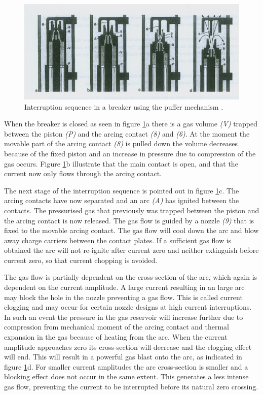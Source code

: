 \documentclass[10pt,a4paper,twoside]{article}
\begin{document}
\begin{figure} [H]
\centering
\includegraphics[scale=0.8]{Bilder/Theory/CircutBreakPuff1.png}
\caption{Interruption sequence in a breaker using the puffer mechanism \cite{bib:HVEbreak}.} \label{fig:CircutBreakPuff1}
\end{figure}

When the breaker is closed as seen in figure \ref{fig:CircutBreakPuff1}a there is a gas volume \textit{(V)} trapped between the piston \textit{(P)} and the arcing contact \textit{(8)} and \textit{(6)}. At the moment the movable part of the arcing contact \textit{(8)} is pulled down the volume decreases because of the fixed piston and an increase in pressure due to compression of the gas occurs. Figure \ref{fig:CircutBreakPuff1}b illustrate that the main contact is open, and that the current now only flows through the arcing contact.

The next stage of the interruption sequence is pointed out in figure \ref{fig:CircutBreakPuff1}c. The arcing contacts have now separated and an arc \textit{(A)} has ignited between the contacts. The pressurised gas that previously was trapped between the piston and the arcing contact is now released. The gas flow is guided by a nozzle \textit{(9)} that is fixed to the movable arcing contact. The gas flow will cool down the arc and blow away charge carriers between the contact plates. If a sufficient gas flow is obtained the arc will not re-ignite after current zero and neither extinguish before current zero, so that current chopping is avoided.

The gas flow is partially dependent on the cross-section of the arc, which again is dependent on the current amplitude. A large current resulting in an large arc may block the hole in the nozzle preventing a gas flow. This is called current clogging and may occur for certain nozzle designs at high current interruptions. In such an event the pressure in the gas reservoir will increase further due to compression from mechanical moment of the arcing contact and thermal expansion in the gas because of heating from the arc. When the current amplitude approaches zero its cross-section will decrease and the clogging effect will end. This will result in a powerful gas blast onto the arc, as indicated in figure \ref{fig:CircutBreakPuff1}d. For smaller current amplitudes the arc cross-section is smaller and a blocking effect does not occur in the same extent. This generates a less intense gas flow, preventing the current to be interrupted before its natural zero crossing.
 
\end{document}

